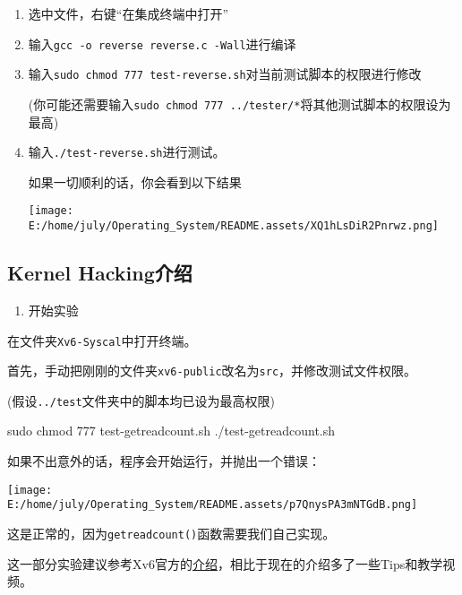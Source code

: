 \documentclass{article}
\newenvironment{Shaded}{}{}
\newcommand{\ExtensionTok}[1]{#1}
\newcommand{\FunctionTok}[1]{\textcolor[rgb]{0.02,0.16,0.49}{#1}}
\newcommand{\NormalTok}[1]{#1}
\begin{document}
\begin{enumerate}
  \def\labelenumi{\arabic{enumi}.}
  \item
        选中文件，右键``在集成终端中打开''
  \item
        输入\texttt{gcc\ -o\ reverse\ reverse.c\ -Wall}进行编译
  \item
        输入\texttt{sudo\ chmod\ 777\ test-reverse.sh}对当前测试脚本的权限进行修改

        (你可能还需要输入\texttt{sudo\ chmod\ 777\ ../tester/*}将其他测试脚本的权限设为最高)
  \item
        输入\texttt{./test-reverse.sh}进行测试。

        如果一切顺利的话，你会看到以下结果

        \texttt{[image: E:/home/july/Operating\_System/README.assets/XQ1hLsDiR2Pnrwz.png]}
\end{enumerate}

\subsection{Kernel Hacking介绍}\label{kernel-hackingux4ecbux7ecd}

\begin{enumerate}
  \def\labelenumi{\arabic{enumi}.}
  \item
        开始实验
\end{enumerate}

在文件夹\texttt{Xv6-Syscal}中打开终端。

首先，手动把刚刚的文件夹\texttt{xv6-public}改名为\texttt{src}，并修改测试文件权限。

(假设\texttt{../test}文件夹中的脚本均已设为最高权限)

\begin{Shaded}
  \begin{Highlighting}[]
    \FunctionTok{sudo}\NormalTok{ chmod 777 test{-}getreadcount.sh}
    \ExtensionTok{./test{-}getreadcount.sh}
  \end{Highlighting}
\end{Shaded}

如果不出意外的话，程序会开始运行，并抛出一个错误：

\texttt{[image: E:/home/july/Operating\_System/README.assets/p7QnysPA3mNTGdB.png]}

这是正常的，因为\texttt{getreadcount()}函数需要我们自己实现。

这一部分实验建议参考Xv6官方的\href{https://github.com/remzi-arpacidusseau/ostep-projects/tree/master/initial-xv6}{介绍}，相比于现在的介绍多了一些Tips和教学视频。
\end{document}
